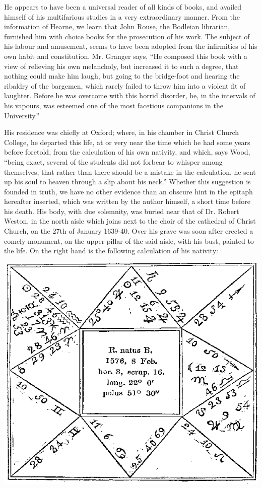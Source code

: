\documentclass[titlepage,12pt,a4]{octavo}
\begin{document}
He appears to have been a universal reader of all kinds of books, and availed himself of his multifarious studies in a very extraordinary manner.
From the information of Hearne, we learn that John Rouse, the Bodleian librarian, furnished him with choice books for the prosecution of his work.
The subject of his labour and amusement, seems to have been adopted from the infirmities of his own habit and constitution.
Mr. Granger says, “He composed this book with a view of relieving his own melancholy, but increased it to such a degree, that nothing could make him laugh, but going to the bridge-foot and hearing the ribaldry of the bargemen, which rarely failed to throw him into a violent fit of laughter.
Before he was overcome with this horrid disorder, he, in the intervals of his vapours, was esteemed one of the most facetious companions in the University.”

His residence was chiefly at Oxford; where, in his chamber in Christ Church College, he departed this life, at or very near the time which he had some years before foretold, from the calculation of his own nativity, and which, says Wood,
“being exact, several of the students did not forbear to whisper among themselves, that rather than there should be a mistake in the calculation, he sent up his soul to heaven through a slip about his neck.” Whether this suggestion is founded in truth, we have no other evidence than an obscure hint in the epitaph hereafter inserted, which was written by the author himself, a short time before his death. His body, with due solemnity, was buried near that of Dr. Robert Weston, in the north aisle which joins next to the choir of the cathedral of Christ Church, on the 27th of January 1639-40.
Over his grave was soon after erected a comely monument, on the upper pillar of the said aisle, with his bust, painted to the life.
On the right hand is the following calculation of his nativity:

\includegraphics[width=\textwidth,keepaspectratio]{horoscope}
\end{document}
